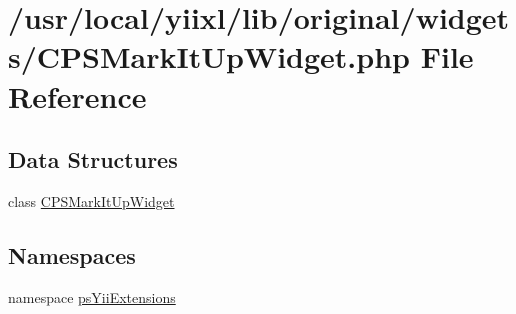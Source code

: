 \hypertarget{CPSMarkItUpWidget_8php}{
\section{/usr/local/yiixl/lib/original/widgets/CPSMarkItUpWidget.php File Reference}
\label{CPSMarkItUpWidget_8php}
}
\subsection*{Data Structures}
\begin{DoxyCompactItemize}
\item 
class \hyperlink{classCPSMarkItUpWidget}{CPSMarkItUpWidget}
\end{DoxyCompactItemize}
\subsection*{Namespaces}
\begin{DoxyCompactItemize}
\item 
namespace \hyperlink{namespacepsYiiExtensions}{psYiiExtensions}
\end{DoxyCompactItemize}
